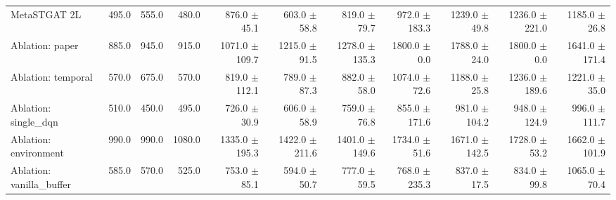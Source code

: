 \begin{table}
\begin{tabular}{@{}lrrrrrrrrrr@{}}
    MetaSTGAT 2L              & 495.0   & 555.0   & 480.0   & 876.0 {\fontsize{4}{4}\selectfont$\pm$45.1}   & 603.0 {\fontsize{4}{4}\selectfont$\pm$58.8}   & 819.0 {\fontsize{4}{4}\selectfont$\pm$79.7}   & 972.0 {\fontsize{4}{4}\selectfont$\pm$183.3}  & 1239.0 {\fontsize{4}{4}\selectfont$\pm$49.8}  & 1236.0 {\fontsize{4}{4}\selectfont$\pm$221.0} & 1185.0 {\fontsize{4}{4}\selectfont$\pm$26.8}  \\
    Ablation: paper           & 885.0   & 945.0   & 915.0   & 1071.0 {\fontsize{4}{4}\selectfont$\pm$109.7} & 1215.0 {\fontsize{4}{4}\selectfont$\pm$91.5}  & 1278.0 {\fontsize{4}{4}\selectfont$\pm$135.3} & 1800.0 {\fontsize{4}{4}\selectfont$\pm$0.0}   & 1788.0 {\fontsize{4}{4}\selectfont$\pm$24.0}  & 1800.0 {\fontsize{4}{4}\selectfont$\pm$0.0}   & 1641.0 {\fontsize{4}{4}\selectfont$\pm$171.4} \\
    Ablation: temporal        & 570.0   & 675.0   & 570.0   & 819.0 {\fontsize{4}{4}\selectfont$\pm$112.1}  & 789.0 {\fontsize{4}{4}\selectfont$\pm$87.3}   & 882.0 {\fontsize{4}{4}\selectfont$\pm$58.0}   & 1074.0 {\fontsize{4}{4}\selectfont$\pm$72.6}  & 1188.0 {\fontsize{4}{4}\selectfont$\pm$25.8}  & 1236.0 {\fontsize{4}{4}\selectfont$\pm$189.6} & 1221.0 {\fontsize{4}{4}\selectfont$\pm$35.0}  \\
    Ablation: single\_dqn     & 510.0   & 450.0   & 495.0   & 726.0 {\fontsize{4}{4}\selectfont$\pm$30.9}   & 606.0 {\fontsize{4}{4}\selectfont$\pm$58.9}   & 759.0 {\fontsize{4}{4}\selectfont$\pm$76.8}   & 855.0 {\fontsize{4}{4}\selectfont$\pm$171.6}  & 981.0 {\fontsize{4}{4}\selectfont$\pm$104.2}  & 948.0 {\fontsize{4}{4}\selectfont$\pm$124.9}  & 996.0 {\fontsize{4}{4}\selectfont$\pm$111.7}  \\
    Ablation: environment     & 990.0   & 990.0   & 1080.0  & 1335.0 {\fontsize{4}{4}\selectfont$\pm$195.3} & 1422.0 {\fontsize{4}{4}\selectfont$\pm$211.6} & 1401.0 {\fontsize{4}{4}\selectfont$\pm$149.6} & 1734.0 {\fontsize{4}{4}\selectfont$\pm$51.6}  & 1671.0 {\fontsize{4}{4}\selectfont$\pm$142.5} & 1728.0 {\fontsize{4}{4}\selectfont$\pm$53.2}  & 1662.0 {\fontsize{4}{4}\selectfont$\pm$101.9} \\
    Ablation: vanilla\_buffer & 585.0   & 570.0   & 525.0   & 753.0 {\fontsize{4}{4}\selectfont$\pm$85.1}   & 594.0 {\fontsize{4}{4}\selectfont$\pm$50.7}   & 777.0 {\fontsize{4}{4}\selectfont$\pm$59.5}   & 768.0 {\fontsize{4}{4}\selectfont$\pm$235.3}  & 837.0 {\fontsize{4}{4}\selectfont$\pm$17.5}   & 834.0 {\fontsize{4}{4}\selectfont$\pm$99.8}   & 1065.0 {\fontsize{4}{4}\selectfont$\pm$70.4}  \\

\end{tabular}
\end{table}

